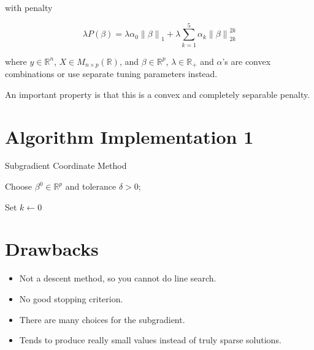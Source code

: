 \documentclass[10pt, reqno]{article}
\numberwithin{equation}{section}
\newcommand{\norm}[1]{\left\lVert#1\right\rVert}
\newcommand{\R}{\mathbb{R}}
\begin{document}
with penalty

\[
\lambda P(\beta) = \lambda \alpha_0 \norm{\beta}_1 + \lambda \sum_{k = 1}^{5} \alpha_k \norm{\beta}_{2k}^{2k} 
\]

where $y \in \R^n$, $X \in M_{n \times p}(\R)$, and $\beta \in \R^p$, $\lambda \in \R_{+}$ and $\alpha$'s are convex combinations or use separate tuning parameters instead.

\vspace{1cm}
An important property is that this is a convex and completely separable penalty.

\newpage
\section*{Algorithm Implementation 1}

\vspace{.5cm}
\begin{algorithm}[H]
\caption{Subgradient Coordinate Method}
Choose $\beta^0 \in \R^p$ and tolerance $\delta > 0$;

Set $k \gets 0$


\end{algorithm}

\newpage
\section*{Drawbacks}

\begin{itemize}
\item Not a descent method, so you cannot do line search.

\item No good stopping criterion.

\item There are many choices for the subgradient.

\item Tends to produce really small values instead of truly sparse solutions.

\end{itemize}
\end{document}
